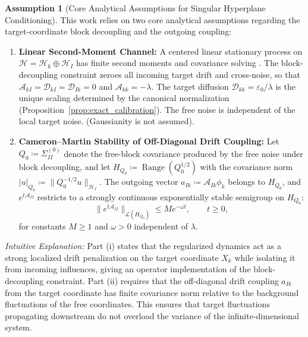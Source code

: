 \documentclass[11pt]{amsart}
\theoremstyle{plain}
\theoremstyle{definition}
\newtheorem{assumption}[theorem]{Assumption}
\theoremstyle{remark}
\begin{document}
\begin{assumption}[Core Analytical Assumptions for Singular Hyperplane Conditioning]
  This work relies on two core analytical assumptions regarding the target-coordinate block decoupling and the outgoing coupling:
  \begin{enumerate}
    \item[(i)] \textbf{Linear Second-Moment Channel:} \label{assum:linear_second_moment} A centered linear stationary process on $\mathcal{H}=\mathcal{H}_k\oplus \mathcal{H}_I$ has finite second moments and covariance solving . The block-decoupling constraint zeroes all incoming target drift and cross-noise, so that $\mathcal{A}_{kI}=\mathcal{D}_{kI}=\mathcal{D}_{Ik}=0$ and $\mathcal{A}_{kk}=-\lambda$. The target diffusion $\mathcal{D}_{kk}=\varepsilon_0/\lambda$ is the unique scaling determined by the canonical normalization (Proposition~\ref{prop:exact_calibration}). The free noise is independent of the local target noise. (Gaussianity is not assumed).
    \item[(ii)] \textbf{Cameron--Martin Stability of Off-Diagonal Drift Coupling:} \label{assum:cm_stability} Let $Q_0\coloneqq\Sigma_{II}^{(0)}$ denote the free-block covariance produced by the free noise under block decoupling, and let $H_{Q_0}\coloneqq\operatorname{Range}(Q_0^{1/2})$ with the covariance norm $|u|_{Q_0}\coloneqq\|Q_0^{-1/2}u\|_{\mathcal{H}_I}$. The outgoing vector $a_{Ik}\coloneqq\mathcal{A}_{Ik}\phi_k$ belongs to $H_{Q_0}$, and $e^{t\mathcal{A}_{II}}$ restricts to a strongly continuous exponentially stable semigroup on $H_{Q_0}$:
    \begin{equation}
      \|e^{t\mathcal{A}_{II}}\|_{\mathcal{L}(H_{Q_0})} \le M e^{-\omega t},\qquad t\ge0,
    \end{equation}
    for constants $M\ge1$ and $\omega>0$ independent of $\lambda$.
  \end{enumerate}
  \vspace{1mm}
  \noindent\textit{Intuitive Explanation:} Part (i) states that the regularized dynamics act as a strong localized drift penalization on the target coordinate $X_k$ while isolating it from incoming influences, giving an operator implementation of the block-decoupling constraint. Part (ii) requires that the off-diagonal drift coupling $a_{Ik}$ from the target coordinate has finite covariance norm relative to the background fluctuations of the free coordinates. This ensures that target fluctuations propagating downstream do not overload the variance of the infinite-dimensional system.
\end{assumption}
\end{document}
